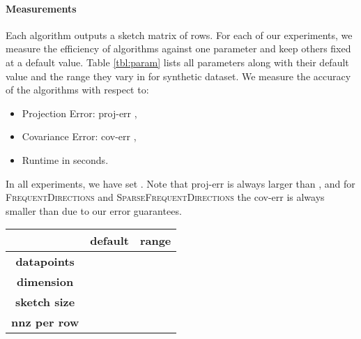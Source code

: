 \documentclass[11pt]{article}
\newcommand{\fd}{\textsc{FrequentDirections}\xspace}
\newcommand{\sfd}{\textsc{SparseFrequentDirections}\xspace}
\newcommand{\Paragraph}[1]{\paragraph*{\sffamily \textbf{#1}}}
\begin{document}
\Paragraph{Measurements} 
Each algorithm outputs a sketch matrix  of  rows.  For each of our experiments, we measure the efficiency of algorithms against one parameter and keep others fixed at a default value.
Table \ref{tbl:param} lists all parameters along with their default value and the range they vary in for synthetic dataset.
We measure the accuracy of the algorithms with respect to:
\begin{itemize}
\item Projection Error:  
\textsf{proj-err} ,
\item Covariance Error: 
\textsf{cov-err} ,
\item Runtime in seconds. 
\end{itemize}
In all experiments, we have set . Note that \textsf{proj-err} is always larger than , and for \fd and \sfd the \textsf{cov-err} is always smaller than  due to our error guarantees.



\begin{table*}[t!!!!]
\caption{Parameter values} \label{tbl:param}
\begin{center}
\begin{small}
\begin{sc}
\begin{tabular}{|c||c|c|}
\hline
 & \textbf{default} & \textbf{range} \\
\hline
\textbf{ datapoints } &  &  \\
\hline
\textbf{dimension } &  &  \\
\hline
\textbf{sketch size } &  &  \\
\hline
\textbf{nnz per row } &  & \\
\hline
\end{tabular}
\end{sc}
\end{small} 
\end{center}
\end{table*}
\end{document}
